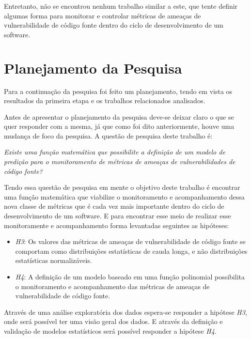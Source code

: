 Entretanto, não se encontrou nenhum trabalho similar a este, que tente definir
algumas forma para monitorar e controlar métricas de ameaças de vulnerabilidade
de código fonte dentro do ciclo de desenvolvimento de um software.




\section{Planejamento da Pesquisa}\label{metodologia:planejamentopesquisa}

Para a continuação da pesquisa foi feito um planejamento, tendo em vista os
resultados da primeira etapa e os trabalhos relacionados analisados.

Antes de apresentar o planejamento da pesquisa deve-se deixar claro o que se quer
responder com a mesma, já que como foi dito anteriormente, houve uma mudança de
foco da pesquisa. A questão de pesquisa deste trabalho é:

\begin{center}
  \textit{Existe uma função matemática que possibilite a definição de um modelo de
  predição para o monitoramento de métricas de ameaças de vulnerabilidades de
  código fonte?}
\end{center}

Tendo essa questão de pesquisa em mente o objetivo deste trabalho é encontrar
uma função matemática que viabilize o monitoramento e acompanhamento dessa nova classe de
métricas que é cada vez mais importante dentro do ciclo de desenvolvimento de um
software. E para encontrar esse meio de realizar esse monitoramente e
acompanhamento forma levantadas seguintes as hipóteses:

\begin{itemize}\label{hipoteses2}
  \item \textit{H3}: Os valores das métricas de ameaças de vulnerabilidade de
    código fonte se comportam como distribuições estatísticas de cauda longa, e
    não distribuições estatísticas normalizáveis.

  \item \textit{H4}: A definição de um modelo baseado em uma função polinomial
    possibilita o monitoramento e acompanhamento das métricas de ameaças de
    vulnerabilidade de código fonte.
\end{itemize}

Através de uma análise exploratória dos dados espera-se responder a hipótese
\textit{H3}, onde será possível ter uma visão geral dos dados. E através da
definição e validação de modelos estatísticos será possível responder a hipótese
\textit{H4}.

